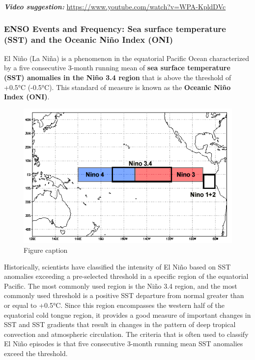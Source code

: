 \documentclass[12pt,oneside]{book}
\begin{document}
\textbf{\emph{Video suggestion:}}
\url{https://www.youtube.com/watch?v=WPA-KpldDVc}

\subsubsection{ENSO Events and Frequency: Sea surface temperature (SST)
and the Oceanic Niño Index
(ONI)}\label{enso-events-and-frequency-sea-surface-temperature-sst-and-the-oceanic-niuxf1o-index-oni}

El Niño (La Niña) is a phenomenon in the equatorial Pacific Ocean
characterized by a five consecutive 3-month running mean of \textbf{sea
surface temperature (SST) anomalies in the Niño 3.4 region} that is
above the threshold of +0.5°C (-0.5°C). This standard of measure is
known as the \textbf{Oceanic Niño Index (ONI)}.

\begin{figure}

{\centering \includegraphics[width=0.8\linewidth]{figures/Figure533d} 

}

\caption{Figure caption}\label{fig:Fig533d}
\end{figure}

Historically, scientists have classified the intensity of El Niño based
on SST anomalies exceeding a pre-selected threshold in a specific region
of the equatorial Pacific. The most commonly used region is the Niño 3.4
region, and the most commonly used threshold is a positive SST departure
from normal greater than or equal to +0.5°C. Since this region
encompasses the western half of the equatorial cold tongue region, it
provides a good measure of important changes in SST and SST gradients
that result in changes in the pattern of deep tropical convection and
atmospheric circulation. The criteria that is often used to classify El
Niño episodes is that five consecutive 3-month running mean SST
anomalies exceed the threshold.
\end{document}
